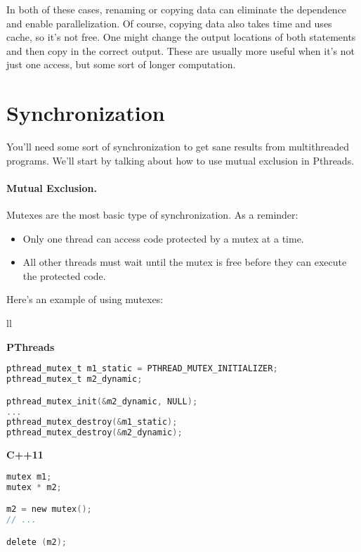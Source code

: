In both of these cases, renaming or copying data can
eliminate the dependence and enable parallelization. Of course,
copying data also takes time and uses cache, so it's not free. One
might change the output locations of both statements and then copy in
the correct output. These are usually more useful when it's not just one
access, but some sort of longer computation.




\section*{Synchronization}
You'll need some sort of synchronization to get sane results from
multithreaded programs. We'll start by talking about how to use
mutual exclusion in Pthreads.


\paragraph{Mutual Exclusion.} Mutexes are the most basic type of synchronization.
As a reminder:
    \begin{itemize}
    \item Only one thread can access code protected by a mutex at a time.
    \item All other threads must wait until the mutex is free before they can
      execute the protected code.
    \end{itemize}

    Here's an example of using mutexes:
    
    \begin{tabular}{ll}
      \begin{minipage}{.65\textwidth}
        {\bf PThreads}
  \begin{lstlisting}[language=C]
pthread_mutex_t m1_static = PTHREAD_MUTEX_INITIALIZER;
pthread_mutex_t m2_dynamic;

pthread_mutex_init(&m2_dynamic, NULL);
...
pthread_mutex_destroy(&m1_static);
pthread_mutex_destroy(&m2_dynamic);
  \end{lstlisting}
      \end{minipage}
      \begin{minipage}{.35\textwidth}
        {\bf C++11}
  \begin{lstlisting}[language=C]
mutex m1;
mutex * m2;

m2 = new mutex();
// ...

delete (m2);
  \end{lstlisting}
      \end{minipage}
    \end{tabular}

